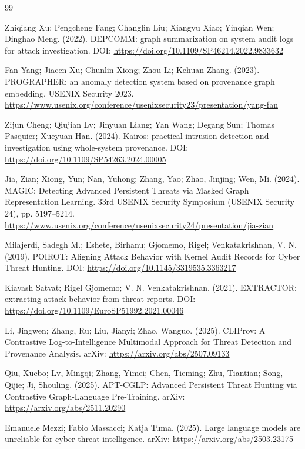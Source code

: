\documentclass[UTF8,a4paper,twocolumn,zihao=5,fontset=fandol]{ctexart}
\begin{document}
\balance
\renewcommand{\refname}{References}
\begin{thebibliography}{99}
\small

Zhiqiang Xu; Pengcheng Fang; Changlin Liu; Xiangyu Xiao; Yinqian Wen; Dinghao Meng. (2022). DEPCOMM: graph summarization on system audit logs for attack investigation. DOI: \url{https://doi.org/10.1109/SP46214.2022.9833632}

Fan Yang; Jiacen Xu; Chunlin Xiong; Zhou Li; Kehuan Zhang. (2023). PROGRAPHER: an anomaly detection system based on provenance graph embedding. USENIX Security 2023. \url{https://www.usenix.org/conference/usenixsecurity23/presentation/yang-fan}

Zijun Cheng; Qiujian Lv; Jinyuan Liang; Yan Wang; Degang Sun; Thomas Pasquier; Xueyuan Han. (2024). Kairos: practical intrusion detection and investigation using whole-system provenance. DOI: \url{https://doi.org/10.1109/SP54263.2024.00005}

Jia, Zian; Xiong, Yun; Nan, Yuhong; Zhang, Yao; Zhao, Jinjing; Wen, Mi. (2024). MAGIC: Detecting Advanced Persistent Threats via Masked Graph Representation Learning. 33rd USENIX Security Symposium (USENIX Security 24), pp. 5197--5214. \url{https://www.usenix.org/conference/usenixsecurity24/presentation/jia-zian}

Milajerdi, Sadegh M.; Eshete, Birhanu; Gjomemo, Rigel; Venkatakrishnan, V. N. (2019). POIROT: Aligning Attack Behavior with Kernel Audit Records for Cyber Threat Hunting. DOI: \url{https://doi.org/10.1145/3319535.3363217}

Kiavash Satvat; Rigel Gjomemo; V. N. Venkatakrishnan. (2021). EXTRACTOR: extracting attack behavior from threat reports. DOI: \url{https://doi.org/10.1109/EuroSP51992.2021.00046}

Li, Jingwen; Zhang, Ru; Liu, Jianyi; Zhao, Wanguo. (2025). CLIProv: A Contrastive Log-to-Intelligence Multimodal Approach for Threat Detection and Provenance Analysis. arXiv: \url{https://arxiv.org/abs/2507.09133}

Qiu, Xuebo; Lv, Mingqi; Zhang, Yimei; Chen, Tieming; Zhu, Tiantian; Song, Qijie; Ji, Shouling. (2025). APT-CGLP: Advanced Persistent Threat Hunting via Contrastive Graph-Language Pre-Training. arXiv: \url{https://arxiv.org/abs/2511.20290}

Emanuele Mezzi; Fabio Massacci; Katja Tuma. (2025). Large language models are unreliable for cyber threat intelligence. arXiv: \url{https://arxiv.org/abs/2503.23175}


\end{thebibliography}
\end{document}
